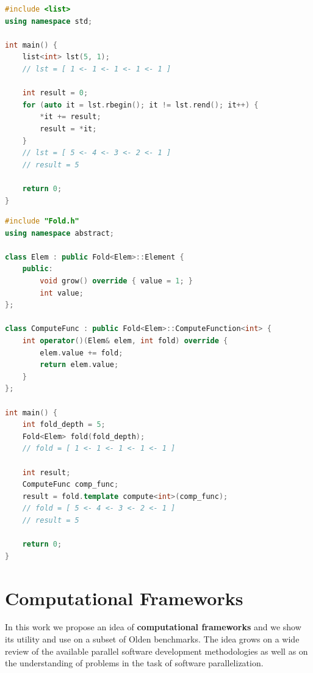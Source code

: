 \begin{lstlisting}[caption={Left fold computation using standard STL list class template},label={lst:left_fold_list},language=C++]
#include <list>
using namespace std;

int main() {
    list<int> lst(5, 1);
    // lst = [ 1 <- 1 <- 1 <- 1 <- 1 ]
    
    int result = 0;
    for (auto it = lst.rbegin(); it != lst.rend(); it++) {
        *it += result;
        result = *it;
    }
    // lst = [ 5 <- 4 <- 3 <- 2 <- 1 ]
    // result = 5
    
    return 0;
}
\end{lstlisting}

\begin{lstlisting}[caption={Left fold computation using our Fold computational framework},label={lst:left_fold_framework},language=C++]
#include "Fold.h"
using namespace abstract;

class Elem : public Fold<Elem>::Element {
    public:
        void grow() override { value = 1; }
        int value;
};

class ComputeFunc : public Fold<Elem>::ComputeFunction<int> {
    int operator()(Elem& elem, int fold) override {
        elem.value += fold;
        return elem.value;
    }
};

int main() {
    int fold_depth = 5;
    Fold<Elem> fold(fold_depth);
    // fold = [ 1 <- 1 <- 1 <- 1 <- 1 ]
    
    int result;
    ComputeFunc comp_func;
    result = fold.template compute<int>(comp_func);
    // fold = [ 5 <- 4 <- 3 <- 2 <- 1 ]
    // result = 5
    
    return 0;
}
\end{lstlisting}

\section{Computational Frameworks}
\label{computational_frameworks_main}
\quad In this work we propose an idea of \textbf{computational frameworks} and we show its utility and use on a subset of Olden benchmarks. The idea grows on a wide review of the available parallel software development methodologies as well as on the understanding of problems in the task of software parallelization.

